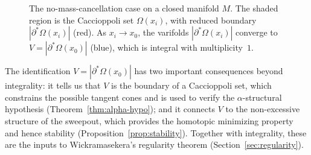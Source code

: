 \begin{figure}[ht]
    \centering
    \caption{The no-mass-cancellation case on a closed manifold $M$. The shaded region is the Caccioppoli set $\Omega(x_i)$, with reduced boundary $|\partial^*\!\Omega(x_i)|$ (red). As $x_i \to x_0$, the varifolds $|\partial^*\!\Omega(x_i)|$ converge to $V = |\partial^*\!\Omega(x_0)|$ (blue), which is integral with multiplicity~$1$.}
    \label{fig:caccioppoli-set}
\end{figure}

The identification $V = |\partial^*\Omega(x_0)|$ has two important consequences beyond integrality: it tells us that $V$ is the boundary of a Caccioppoli set, which constrains the possible tangent cones and is used to verify the $\alpha$-structural hypothesis (Theorem~\ref{thm:alpha-hypo}); and it connects $V$ to the non-excessive structure of the sweepout, which provides the homotopic minimizing property and hence stability (Proposition~\ref{prop:stability}). Together with integrality, these are the inputs to Wickramasekera's regularity theorem (Section~\ref{sec:regularity}).

